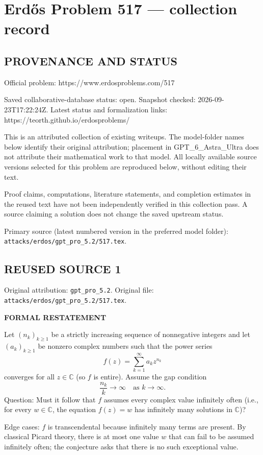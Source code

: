 \section*{Erd\H{o}s Problem 517 --- collection record}

\subsection*{PROVENANCE AND STATUS}
Official problem: https://www.erdosproblems.com/517

Saved collaborative-database status: open.
Snapshot checked: 2026-09-23T17:22:24Z.
Latest status and formalization links: https://teorth.github.io/erdosproblems/

This is an attributed collection of existing writeups. The model-folder names below identify their original attribution; placement in GPT\_6\_Astra\_Ultra does not attribute their mathematical work to that model. All locally available source versions selected for this problem are reproduced below, without editing their text.

Proof claims, computations, literature statements, and completion estimates in the reused text have not been independently verified in this collection pass. A source claiming a solution does not change the saved upstream status.

Primary source (latest numbered version in the preferred model folder): \texttt{attacks/erdos/gpt\_pro\_5.2/517.tex}.

\subsection*{REUSED SOURCE 1}
Original attribution: \texttt{gpt\_pro\_5.2}.
Original file: \texttt{attacks/erdos/gpt\_pro\_5.2/517.tex}.

\noindent\textbf{FORMAL RESTATEMENT}

Let $(n_k)_{k\ge 1}$ be a strictly increasing sequence of nonnegative integers and let $(a_k)_{k\ge 1}$ be nonzero complex numbers such that the power series
\[
f(z)=\sum_{k=1}^{\infty} a_k z^{n_k}
\]
converges for all $z\in\mathbb{C}$ (so $f$ is entire). Assume the gap condition
\[
\frac{n_k}{k}\to\infty\quad\text{as }k\to\infty.
\]
Question: Must it follow that $f$ assumes every complex value infinitely often (i.e., for every $w\in\mathbb{C}$, the equation $f(z)=w$ has infinitely many solutions in $\mathbb{C}$)?

Edge cases: $f$ is transcendental because infinitely many terms are present. By classical Picard theory, there is at most one value $w$ that can fail to be assumed infinitely often; the conjecture asks that there is no such exceptional value.

